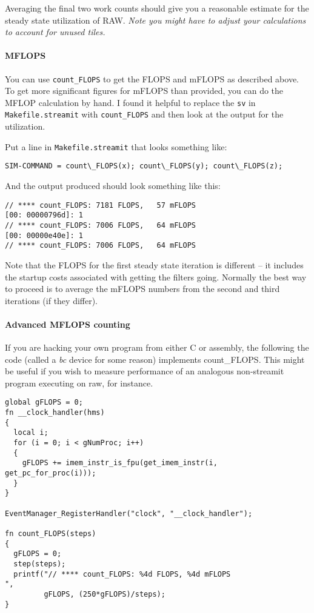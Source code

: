 Averaging the final two work counts should give you a reasonable estimate for
the steady state utilization of RAW. \textit{Note you might have to adjust your calculations
to account for unused tiles.}

\paragraph{MFLOPS} 
You can use \texttt{count\_FLOPS} to get the FLOPS and mFLOPS as described above. To get more
significant figures for mFLOPS than provided, you can do the MFLOP calculation by hand. I found it
helpful to replace the \texttt{sv} in \texttt{Makefile.streamit} with \texttt{count\_FLOPS} and then look
at the output for the utilization.

Put a line in \texttt{Makefile.streamit} that looks something like:
\begin{verbatim}SIM-COMMAND = count\_FLOPS(x); count\_FLOPS(y); count\_FLOPS(z);\end{verbatim} 


And the output produced should look something like this:
\begin{verbatim}
// **** count_FLOPS: 7181 FLOPS,   57 mFLOPS
[00: 00000796d]: 1
// **** count_FLOPS: 7006 FLOPS,   64 mFLOPS
[00: 00000e40e]: 1
// **** count_FLOPS: 7006 FLOPS,   64 mFLOPS
\end{verbatim}

Note that the FLOPS for the first steady state iteration is different -- 
it includes the startup costs associated with getting the filters going. Normally the best 
way to proceed is to average the mFLOPS numbers from the second and
third iterations (if they differ).

\paragraph{Advanced MFLOPS counting}
If you are hacking your own program from either C or assembly, 
the following the code (called a \textit{bc} device for some reason) implements count\_FLOPS.
This might be useful if you wish to measure performance of an analogous non-streamit
program executing on raw, for instance.

\begin{verbatim}
global gFLOPS = 0;
fn __clock_handler(hms)
{
  local i;
  for (i = 0; i < gNumProc; i++)
  {
    gFLOPS += imem_instr_is_fpu(get_imem_instr(i, get_pc_for_proc(i)));
  }
}

EventManager_RegisterHandler("clock", "__clock_handler");

fn count_FLOPS(steps)
{
  gFLOPS = 0;
  step(steps);
  printf("// **** count_FLOPS: %4d FLOPS, %4d mFLOPS
",
         gFLOPS, (250*gFLOPS)/steps);
}


\end{verbatim}

